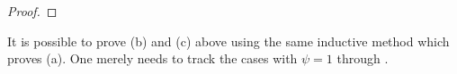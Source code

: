 \begin{proof}
\end{proof}
\begin{remark}
    It is possible to prove (b) and (c) above using the same inductive method which proves (a). One merely needs to track the cases with $\psi=1$ through .
\end{remark}
